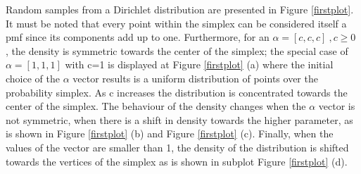 \documentclass [twoside,hidelinks]{article}
\begin{document}
Random samples from a Dirichlet distribution are presented in Figure \ref{firstplot}. It must be noted that every point within the simplex can be considered itself a pmf since its components add up to one.  Furthermore, for an $ \alpha =  [c,c,c]\ ,c \ge 0 $ , the density is symmetric towards the center of the simplex; the special case of $ \alpha =  [1,1,1] $ with c=1 is displayed at Figure \ref{firstplot} (a) where the initial choice of the $\alpha$ vector results is a uniform distribution of points over the probability simplex. As c increases the distribution is concentrated towards the center of the simplex. The behaviour of the density changes when the $\alpha$ vector is not symmetric, when there is a shift in density towards the higher parameter, as is shown in Figure \ref{firstplot} (b) and Figure \ref{firstplot} (c). Finally, when the values of the vector are smaller than 1, the density of the distribution is shifted towards the vertices of the simplex as is shown in subplot Figure \ref{firstplot} (d).
\end{document}
